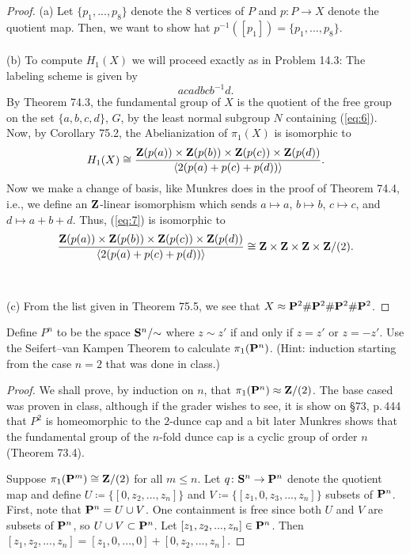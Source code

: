 \begin{proof}
(a) Let $\{p_1,...,p_8\}$ denote the $8$ vertices of $P$ and $p\colon P\to
X$ denote the quotient map. Then, we want to show hat
$p^{-1}([p_1])=\{p_1,...,p_8\}$.
\\\\
(b) To compute $H_1(X)$ we will proceed exactly as in Problem 14.3: The
labeling scheme is given by
\begin{equation}
\label{eq:6}
acadbcb^{-1}d.
\end{equation}
By Theorem 74.3, the fundamental group of $X$ is the quotient of the free
group on the set $\{a,b,c,d\}$, $G$, by the least normal subgroup $N$
containing (\ref{eq:6}). Now, by Corollary 75.2, the Abelianization of
$\pi_1(X)$ is isomorphic to
\begin{equation}
\label{eq:7}
H_1(X)\cong
\frac{\mathbf{Z}(p(a))\times\mathbf{Z}(p(b))\times\mathbf{Z}(p(c))\times\mathbf{Z}(p(d))}
{\left<2(p(a)+p(c)+p(d))\right>}.
\end{equation}
Now we make a change of basis, like Munkres does in the proof of Theorem
74.4, i.e., we define an $\mathbf{Z}$-linear isomorphism which sends $a\mapsto a$,
$b\mapsto b$, $c\mapsto c$, and $d\mapsto a+b+d$. Thus, (\ref{eq:7}) is
isomorphic to
\[
\frac{\mathbf{Z}(p(a))\times\mathbf{Z}(p(b))\times\mathbf{Z}(p(c))\times\mathbf{Z}(p(d))}
{\left<2(p(a)+p(c)+p(d))\right>}\cong\mathbf{Z}\times\mathbf{Z}\times\mathbf{Z}\times\mathbf{Z}/(2).
\]
\\\\
(c) From the list given in Theorem 75.5, we see that
$X\approx\mathbf{P}^2\#\mathbf{P}^2\#\mathbf{P}^2\#\mathbf{P}^2$.
\end{proof}
\newpage
\begin{problem}[A]
Define $P^n$ to be the space $\mathbf{S}^n/{\sim}$ where $z\sim z'$ if and only
if $z=z'$ or $z=-z'$. Use the Seifert--van Kampen Theorem to calculate
$\pi_1(\mathbf{P}^n)$. (Hint: induction starting from the case $n=2$ that was
done in class.)
\end{problem}
\begin{proof}
We shall prove, by induction on $n$, that
$\pi_1(\mathbf{P}^n)\approx\mathbf{Z}/(2)$. The base cased was proven in class,
although if the grader wishes to see, it is show on \S73, p.\,444 that
$P^2$ is homeomorphic to the $2$-dunce cap and a bit later Munkres shows
that the fundamental group of the $n$-fold dunce cap is a cyclic group of
order $n$ (Theorem 73.4).

Suppose $\pi_1(\mathbf{P}^m)\cong\mathbf{Z}/(2)$ for all $m\leq n$. Let
$q\colon\mathbf{S}^n\to\mathbf{P}^n$ denote the quotient map and define
$U\coloneqq\{[0,z_2,...,z_n]\}$ and $V\coloneqq\{[z_1,0,z_3,...,z_n]\}$
subsets of $\mathbf{P}^n$. First, note that $\mathbf{P}^n=U\cup V$. One containment is
free since both $U$ and $V$ are subsets of $\mathbf{P}^n$, so $U\cup
V\subset\mathbf{P}^n$. Let $[z_1,z_2,...,z_n]\in\mathbf{P}^n$. Then
$[z_1,z_2,...,z_n]=[z_1,0,...,0]+[0,z_2,...,z_n]$.
\end{proof}
